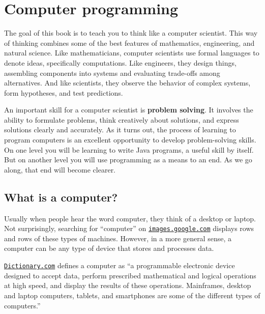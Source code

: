\chapter{Computer programming}
\label{theway}

The goal of this book is to teach you to think like a computer scientist.
This way of thinking combines some of the best features of mathematics, engineering, and natural science.
Like mathematicians, computer scientists use formal languages to denote ideas, specifically computations.
Like engineers, they design things, assembling components into systems and evaluating trade-offs among alternatives.
And like scientists, they observe the behavior of complex systems, form hypotheses, and test predictions.


An important skill for a computer scientist is {\bf problem solving}.
It involves the ability to formulate problems, think creatively about solutions, and express solutions clearly and accurately.
As it turns out, the process of learning to program computers is an excellent opportunity to develop problem-solving skills.
On one level you will be learning to write Java programs, a useful skill by itself.
But on another level you will use programming as a means to an end.
As we go along, that end will become clearer.


\section{What is a computer?}

Usually when people hear the word computer, they think of a desktop or laptop.
Not surprisingly, searching for ``computer'' on \href{https://images.google.com/}{\tt images.google.com} displays rows and rows of these types of machines.
However, in a more general sense, a computer can be any type of device that stores and processes data.

\href{http://www.dictionary.com/browse/computer}{\tt Dictionary.com} defines a computer as ``a programmable electronic device designed to accept data, perform prescribed mathematical and logical operations at high speed, and display the results of these operations. Mainframes, desktop and laptop computers, tablets, and smartphones are some of the different types of computers.''


